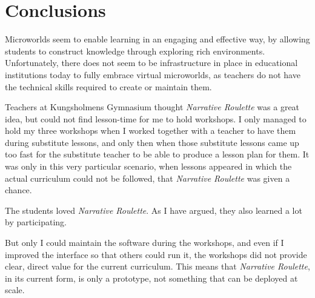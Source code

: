 \section{Conclusions}

Microworlds seem to enable learning in an engaging and effective way, by
allowing students to construct knowledge through exploring rich environments.
Unfortunately, there does not seem to be infrastructure in place in
educational institutions today to fully embrace virtual microworlds, as teachers do
not have the technical skills required to create or maintain them.

Teachers at Kungsholmens Gymnasium thought \emph{Narrative Roulette} was
a great idea, but could not find lesson-time for me to hold workshops. I only
managed to hold my three workshops when I worked together with a teacher
to have them during substitute lessons, and only then when those
substitute lessons came up too fast for the substitute teacher to be
able to produce a lesson plan for them. It was only in this very
particular scenario, when lessons appeared in which the actual
curriculum could not be followed, that \emph{Narrative Roulette} was
given a chance.

The students loved \emph{Narrative Roulette}\cite{ingulfson}. As I have argued, they also
learned a lot by participating.

But only I could maintain the software during the workshops, and even if
I improved the interface so that others could run it, the workshops did
not provide clear, direct value for the current curriculum. This means
that \emph{Narrative Roulette}, in its current form, is only a
prototype, not something that can be deployed at scale. 
